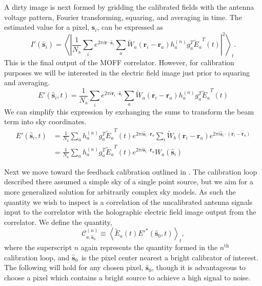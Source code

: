 \documentclass[a4paper,fleqn,usenatbib]{../mnras}
\newcommand{\Nant}{\ensuremath{N_{\mathrm{a}}}}
\newcommand{\s}{\ensuremath{\hat{\mathbf{s}}}} %
\newcommand{\spix}{\ensuremath{\hat{\mathbf{s}}_{0}}}
\newcommand{\Cna}[1][n]{\ensuremath{\mathcal{C}^{(#1)}_{a,\spix}}}
\newcommand{\ri}{\ensuremath{\mathbf{r}_i}}
\newcommand{\ra}{\ensuremath{\mathbf{r}_a}}
\newcommand{\beamr}{\ensuremath{\widetilde{W}}}
\newcommand{\beamtheta}{\ensuremath{W}}
\newcommand{\Er}[1]{\ensuremath{\widetilde{E}_{#1}}}
\newcommand{\Ethetaest}{\ensuremath{E'}}
\begin{document}
A dirty image is next formed by gridding the calibrated fields with the antenna voltage pattern, Fourier transforming, squaring, and averaging in time. The estimated value for a pixel, $\s_i$, can be expressed as
\begin{equation}
I'(\s_i) = \left<\left| \frac{1}{\Nant}\sum_i e^{2\pi i \mathbf{r}\cdot \s_i} \sum_a \beamr_a(\ri - \ra) h^{(n)}_a g^T_a \Er{a}^T(t) \right|^2 \right>_t.
\end{equation}
This is the final output of the MOFF correlator. However, for calibration purposes we will be interested in the electric field image just prior to squaring and averaging.
\begin{equation}
\Ethetaest (\s_i,t) = \frac{1}{\Nant} \sum_i e^{2\pi i \ri \cdot \s_i} \sum_a \beamr_a(\ri - \ra) h^{(n)}_a g^T_a \Er{a}^T(t)
\end{equation}
We can simplify this expression by exchanging the sums to transform the beam term into sky coordinates.
\begin{align}\label{eq:epix}
\Ethetaest(\s_i,t) & = \frac{1}{\Nant} \sum_a h^{(n)}_a g^T_a\Er{a}^T(t) e^{2\pi i \s_i \cdot \ra}\sum_i \beamr_b(\ri-\ra)e^{2\pi i \s_i \cdot (\ri-\ra)} \nonumber\\
& = \frac{1}{\Nant} \sum_a h^{(n)}_a g^T_a\Er{a}^T(t) e^{2\pi i \s_i \cdot \ra}\beamtheta_a(\s_i)
\end{align}

Next we move toward the feedback calibration outlined in \citealt{mor11}. The calibration loop described there assumed a simple sky of a single point source, but we aim for a more generalized solution for arbitrarily complex sky models. As such the quantity we wish to inspect is a correlation of the uncalibrated antenna signals input to the correlator with the holographic electric field image output from the correlator. We define the quantity,
\begin{equation}\label{eq:Cna}
\Cna \equiv \left<\Er{a}(t) E'^*(\spix,t)\right>_t,
\end{equation}
where the superscript $n$ again represents the quantity formed in the $n^\mathrm{th}$ calibration loop, and \spix\, is the pixel center nearest a bright calibrator of interest. The following will hold for any chosen pixel, \spix, though it is advantageous to choose a pixel which contains a bright source to achieve a high signal to noise. 
\end{document}
